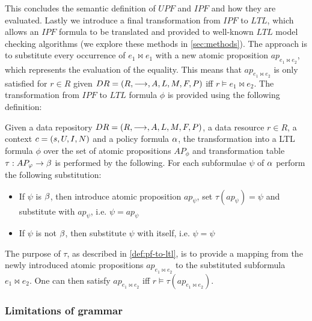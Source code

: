 This concludes the semantic definition of $UPF$ and $IPF$ and how they are evaluated. Lastly we introduce a final transformation from $IPF$ to $LTL$, which allows an $IPF$ formula to be translated and provided to well-known $LTL$ model checking algorithms (we explore these methods in \ref{sec:methods}). The approach is to substitute every occurrence of $e_1 \bowtie e_1$ with a new atomic proposition $ap_{e_1 \bowtie e_2}$, which represents the evaluation of the equality. This means that $ap_{e_1 \bowtie e_2}$ is only satisfied for $r \in R$ given $DR= \left( R, \longrightarrow, A, L, M, F, P \right)$ iff $r \models e_1 \bowtie e_2$. The transformation from $IPF$ to $LTL$ formula $\phi$ is provided using the following definition:
\begin{definition}\label{def:pf-to-ltl}
Given a data repository $DR= \left( R, \longrightarrow, A, L, M, F, P \right)$, a data resource $r \in R$, a context $c = \left( s, U, I, N \right)$ and a policy formula $\alpha$, the transformation into a LTL formula $\phi$ over the set of atomic propositions $AP_\phi$ and transformation table $\tau : AP_\varphi \rightarrow \beta$ is performed by the following. For each subformulae $\psi$ of $\alpha$ perform the following substitution:
\begin{itemize}
    \item If $\psi$ is $\beta$, then introduce atomic proposition $ap_\psi$, set $\tau(ap_\psi) = \psi$ and substitute with $ap_\psi$, i.e. $\psi = ap_\psi$
    \item If $\psi$ is not $\beta$, then substitute $\psi$ with itself, i.e. $\psi = \psi$
\end{itemize}
\end{definition}
The purpose of $\tau$, as described in \autoref{def:pf-to-ltl}, is to provide a mapping from the newly introduced atomic propositions $ap_{e_1 \bowtie e_2}$ to the substituted subformula $e_1 \bowtie e_2$. One can then satisfy $ap_{e_1 \bowtie e_2}$ iff $r \models \tau(ap_{e_1 \bowtie e_2})$.

\subsubsection{Limitations of grammar}